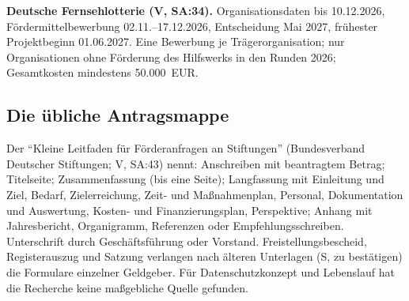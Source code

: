 \documentclass[10pt,parskip=half-]{scrartcl}
\begin{document}
\textbf{Deutsche Fernsehlotterie (V, SA:34).} Organisationsdaten bis 10.12.2026,
Fördermittelbewerbung 02.11.--17.12.2026, Entscheidung Mai 2027, frühester Projektbeginn
01.06.2027. Eine Bewerbung je Trägerorganisation; nur Organisationen ohne Förderung des
Hilfswerks in den Runden 2026; Gesamtkosten mindestens 50.000~EUR.

\subsection{Die übliche Antragsmappe}
Der \enquote{Kleine Leitfaden für Förderanfragen an Stiftungen} (Bundesverband Deutscher
Stiftungen; V, SA:43) nennt: Anschreiben mit beantragtem Betrag; Titelseite; Zusammenfassung
(bis eine Seite); Langfassung mit Einleitung und Ziel, Bedarf, Zielerreichung, Zeit- und
Maßnahmenplan, Personal, Dokumentation und Auswertung, Kosten- und Finanzierungsplan,
Perspektive; Anhang mit Jahresbericht, Organigramm, Referenzen oder Empfehlungsschreiben.
Unterschrift durch Geschäftsführung oder Vorstand. Freistellungsbescheid, Registerauszug und
Satzung verlangen nach älteren Unterlagen (S, zu bestätigen) die Formulare einzelner Geldgeber. Für Datenschutzkonzept und Lebenslauf hat
die Recherche keine maßgebliche Quelle gefunden.
\end{document}
